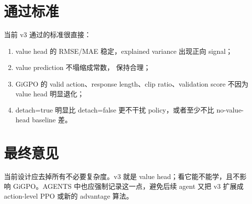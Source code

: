 \documentclass[10pt]{ctexart}
\begin{document}
\section*{通过标准}
当前 v3 通过的标准很直接：
\begin{enumerate}
  \item value head 的 RMSE/MAE 稳定，explained variance 出现正向 signal；
  \item value prediction 不塌缩成常数， 保持合理；
  \item GiGPO 的 valid action、response length、clip ratio、validation score 不因为 value head 明显退化；
  \item detach=true 明显比 detach=false 更不干扰 policy，或者至少不比 no-value-head baseline 差。
\end{enumerate}

\section*{最终意见}
当前设计应去掉所有不必要复杂度。v3 就是 value head；看它能不能学，且不影响 GiGPO。AGENTS 中也应强制记录这一点，避免后续 agent 又把 v3 扩展成 action-level PPO 或新的 advantage 算法。
\end{document}
